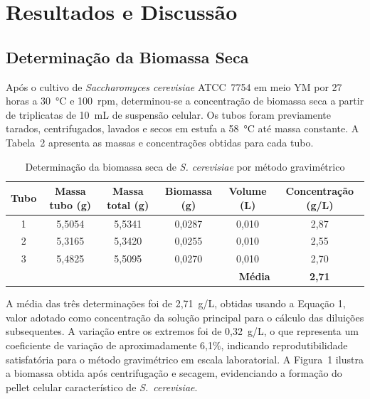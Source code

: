 
\section{Resultados e Discussão}

\subsection{Determinação da Biomassa Seca}

Após o cultivo de \textit{Saccharomyces cerevisiae} ATCC~7754 em meio YM por 27 horas a 30~°C e 100~rpm, determinou-se a concentração de biomassa seca a partir de triplicatas de 10~mL de suspensão celular. Os tubos foram previamente tarados, centrifugados, lavados e secos em estufa a 58~°C até massa constante. A Tabela~2 apresenta as massas e concentrações obtidas para cada tubo.

\begin{table}[H]
\caption{Determinação da biomassa seca de \textit{S. cerevisiae} por método gravimétrico}
\centering
\begin{tabular}{cccccc}
\toprule
\textbf{Tubo} &
\textbf{Massa tubo (g)} &
\textbf{Massa total (g)} &
\textbf{Biomassa (g)} &
\textbf{Volume (L)} &
\textbf{Concentração (g/L)} \\
\midrule
1 & 5,5054 & 5,5341 & 0,0287 & 0,010 & 2,87 \\
2 & 5,3165 & 5,3420 & 0,0255 & 0,010 & 2,55 \\
3 & 5,4825 & 5,5095 & 0,0270 & 0,010 & 2,70 \\
\midrule
\multicolumn{5}{r}{\textbf{Média}} & \textbf{2,71} \\
\bottomrule
\end{tabular}
\end{table}

A média das três determinações foi de 2,71~g/L, obtidas usando a Equação 1, valor adotado como concentração da solução principal para o cálculo das diluições subsequentes. A variação entre os extremos foi de 0,32~g/L, o que representa um coeficiente de variação de aproximadamente 6,1\%, indicando reprodutibilidade satisfatória para o método gravimétrico em escala laboratorial. A Figura~1 ilustra a biomassa obtida após centrifugação e secagem, evidenciando a formação do pellet celular característico de \textit{S.~cerevisiae}.

